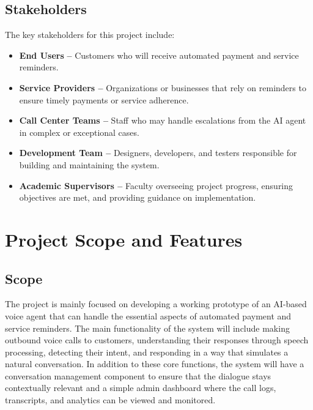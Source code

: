 \documentclass[12pt,a4paper]{report}
\begin{document}
\section{Stakeholders}

The key stakeholders for this project include:

\begin{itemize}[itemsep=6pt] %
    \item \textbf{End Users}\textbf{ –} Customers who will receive automated payment and service reminders.
    
    \item \textbf{Service Providers –} Organizations or businesses that rely on reminders to ensure timely payments or service adherence.
    
    \item \textbf{Call Center Teams –} Staff who may handle escalations from the AI agent in complex or exceptional cases.
    
    \item \textbf{Development Team –} Designers, developers, and testers responsible for building and maintaining the system.
    
    \item \textbf{Academic Supervisors –} Faculty overseeing project progress, ensuring objectives are met, and providing guidance on implementation.
\end{itemize}


\chapter{Project Scope and Features}

\section{Scope}

The project is mainly focused on developing a working prototype of an AI-based voice agent that can handle the essential aspects of automated payment and service reminders. The main functionality of the system will include making outbound voice calls to customers, understanding their responses through speech processing, detecting their intent, and responding in a way that simulates a natural conversation. In addition to these core functions, the system will have a conversation management component to ensure that the dialogue stays contextually relevant and a simple admin dashboard where the call logs, transcripts, and analytics can be viewed and monitored. 
\end{document}
